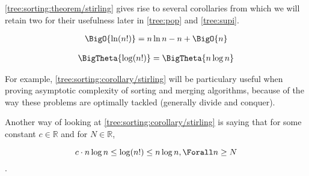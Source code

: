 \ref{tree:sorting:theorem/stirling} gives rise to several corollaries from which we will retain two for their usefulness later in \ref{tree:pop} and \ref{tree:supi}.



\begin{corollary}
\begin{align*}
\BigO{\ln(n!)} &= n \ln n - n + \BigO{n}\\
\end{align*}
\end{corollary}



\begin{corollary}
\label{tree:sorting:corollary/stirling}
\begin{align*}
\BigTheta{\log(n!)} &= \BigTheta{n \log n}\\
\end{align*}
\end{corollary}


For example, \ref{tree:sorting:corollary/stirling} will be particulary useful when proving asymptotic complexity of sorting and merging algorithms, because of the way these problems are optimally tackled (generally divide and conquer).

Another way of looking at \ref{tree:sorting:corollary/stirling} is saying that for some constant $c \in \mathbb{R}$ and for $N \in \mathbb{R}$,


$$c \cdot n \log n \leq \log(n!) \leq n \log n, \Forall n \geq N$$.
